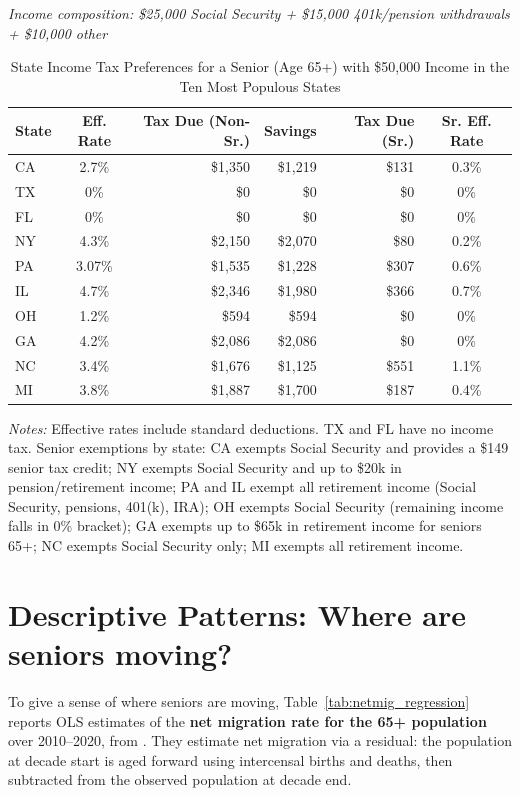 \documentclass[11pt]{article}
\begin{document}
\begin{table}[htbp]
    \centering
    \caption{State Income Tax Preferences for a Senior (Age 65+) with \$50,000 Income in the Ten Most Populous States}
    \label{tab:senior_tax_prefs}
    \smallskip
    \small
    \textit{Income composition: \$25,000 Social Security + \$15,000 401k/pension withdrawals + \$10,000 other}
    \vspace{0.5em}
    
    \begin{tabular}{l c r r r c}
    \toprule
    \textbf{State} & \textbf{Eff. Rate} & \textbf{Tax Due (Non-Sr.)} & \textbf{Savings} & \textbf{Tax Due (Sr.)} & \textbf{Sr. Eff. Rate} \\
    \midrule
    CA & 2.7\%  & \$1,350 & \$1,219 & \$131 & 0.3\% \\
    TX & 0\%    & \$0     & \$0     & \$0   & 0\% \\
    FL & 0\%    & \$0     & \$0     & \$0   & 0\% \\
    NY & 4.3\%  & \$2,150 & \$2,070 & \$80  & 0.2\% \\
    PA & 3.07\% & \$1,535 & \$1,228 & \$307 & 0.6\% \\
    IL & 4.7\%  & \$2,346 & \$1,980 & \$366 & 0.7\% \\
    OH & 1.2\%  & \$594   & \$594   & \$0   & 0\% \\
    GA & 4.2\%  & \$2,086 & \$2,086 & \$0   & 0\% \\
    NC & 3.4\%  & \$1,676 & \$1,125 & \$551 & 1.1\% \\
    MI & 3.8\%  & \$1,887 & \$1,700 & \$187 & 0.4\% \\
    \bottomrule
    \end{tabular}
    
    \vspace{0.5em}
    \raggedright
    \footnotesize
    \textit{Notes:} Effective rates include standard deductions. TX and FL have no income tax. Senior exemptions by state: CA exempts Social Security and provides a \$149 senior tax credit; NY exempts Social Security and up to \$20k in pension/retirement income; PA and IL exempt all retirement income (Social Security, pensions, 401(k), IRA); OH exempts Social Security (remaining income falls in 0\% bracket); GA exempts up to \$65k in retirement income for seniors 65+; NC exempts Social Security only; MI exempts all retirement income. 
    \end{table}
\section{Descriptive Patterns: Where are seniors moving?}
To give a sense of where seniors are moving, Table~\ref{tab:netmig_regression} reports OLS estimates of the \textbf{net migration rate for the 65+ population} over 2010--2020, from \citet{EganRobertson2024}. They estimate net migration via a residual: the population at decade start is aged forward using intercensal births and deaths, then subtracted from the observed population at decade end.
\end{document}
